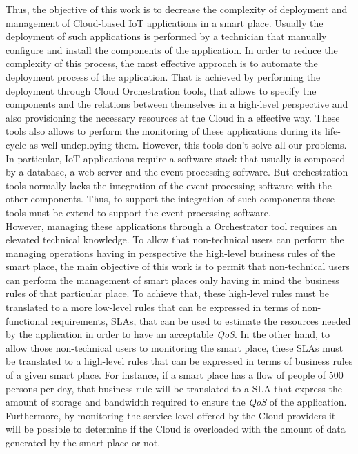 Thus, the objective of this work is to decrease the complexity of deployment and management of Cloud-based IoT applications in a smart place.
Usually the deployment of such applications is performed by a technician that manually configure and install the components of the application.
In order to reduce the complexity of this process, the most effective approach is to automate the deployment process of the application. That is achieved
by performing the deployment through Cloud Orchestration tools, that allows to specify the components and the relations between themselves in a high-level
perspective and also provisioning the necessary resources at the Cloud in a effective way. These tools also allows to perform the monitoring of these applications
during its life-cycle as well undeploying them. However, this tools don't solve all our problems. In particular, IoT applications require a software stack that usually
is composed by a database, a web server and the event processing software. But orchestration tools normally lacks the integration of
the event processing software with the other components. Thus, to support the integration of such components these tools must be extend to support the event processing
software.\\

However, managing these applications through a Orchestrator tool requires an elevated technical knowledge. To allow that non-technical users can perform the
managing operations having in perspective the high-level business rules of the smart place, the main objective of this work is to permit that non-technical users
can perform the management of smart places only having in mind the business rules of that particular place. To achieve that, these high-level rules must be translated to
a more low-level rules that can be expressed in terms of non-functional requirements, SLAs, that can be used to estimate the resources needed by the application in order
to have an acceptable \textit{QoS}. In the other hand, to allow those non-technical users to monitoring the smart place, these SLAs must be translated to
a high-level rules that can be expressed in terms of business rules of a given smart place. For instance, if a smart place has a flow of people of 500 persons per day,
that business rule will be translated to a SLA that express the amount of storage and bandwidth required to ensure the \textit{QoS} of the application.
Furthermore, by monitoring the service level offered by the Cloud providers it will be possible to determine if the Cloud is overloaded with the
amount of data generated by the smart place or not.
